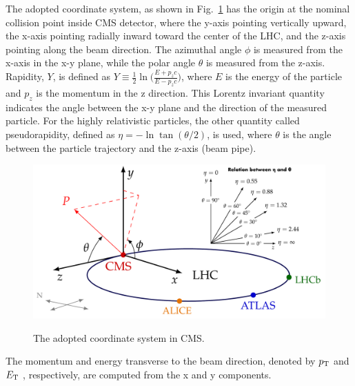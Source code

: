 The adopted coordinate system, as shown in Fig.~\ref{fig:cmscoordinate} has the origin at the nominal collision point inside CMS detector, where the y-axis pointing vertically upward, the x-axis pointing radially inward toward the center of the LHC, and the z-axis pointing along the beam direction. The azimuthal angle $\phi$ is measured from the x-axis in the x-y plane, while the polar angle $\theta$ is measured from the z-axis. 
Rapidity, $\mathit{Y}$, is defined as $\mathit{Y}\equiv\frac{1}{2}\ln\big(\frac{E+p_{z}c}{E-p_{z}c}\big)$, where $E$ is the energy of the particle and $p_{z}$ is the momentum in the z direction.
This Lorentz invariant quantity indicates the angle between the x-y plane and the direction of the measured particle.
For the highly relativistic particles, the other quantity called pseudorapidity, defined as $\eta = -\ln \tan(\theta /2)$, is used, where $\theta$ is the angle between the particle trajectory and the z-axis (beam pipe).

\begin{figure}[!ht]
  \begin{center}
    \includegraphics[width=1.0\textwidth]{Fig/cms_coordinate}\\
    \caption{The adopted coordinate system in CMS. \label{fig:cmscoordinate}}
  \end{center}
\end{figure}

The momentum and energy transverse to the beam direction, denoted by $p_{\mathrm{T}}$ and $E_{\mathrm{T}}$ , respectively, are computed from the x and y components.

